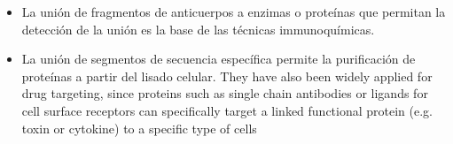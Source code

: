 \begin{itemize}
\item La unión de fragmentos de anticuerpos a enzimas o proteínas que permitan la detección de la unión es la base de las técnicas immunoquímicas.
\item La unión de segmentos de secuencia específica permite la purificación de proteínas a partir del lisado celular. 
They have also been widely applied for drug targeting, since proteins such as single chain antibodies or ligands for cell surface receptors can 
specifically target a linked functional protein (e.g. toxin or cytokine) to a specific type of cells
\end{itemize}










